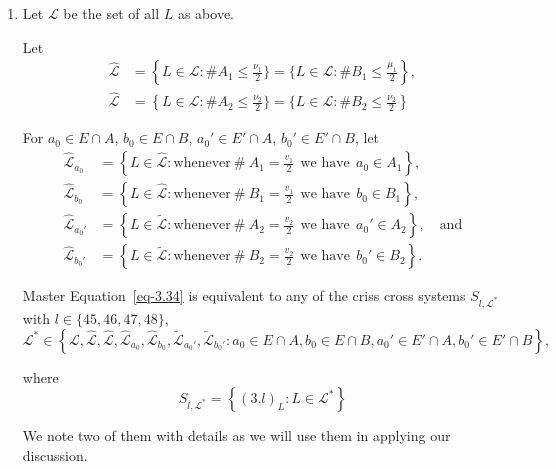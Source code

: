 \documentclass[a4paper,12pt]{article}
\theoremstyle{definition}
\theoremstyle{underlinethm}
\theoremstyle{definition}
\begin{document}
\begin{enumerate}[label=(\alph*)]
\item Let $\mathcal{L}$ be the set of all $L$ as above.

Let
\begin{align*}
\hat{\mathcal{L}} & = \left\{L \in  \mathcal{L} : \# A_{1} \leq \frac{\nu_{1}}{2}\} = \{L \in \mathcal{L} : \# B_{1} \leq \frac{\mu_{1}}{2}\right\},\\
\hat{\mathcal{L}} & = \left\{L \in \mathcal{L}  : \# A_{2} \leq \frac{\nu_{2}}{2}\} = \{L \in \mathcal{L} : \# B_{2} \leq \frac{\nu_{2}}{2}\right\}
\end{align*}

For $a_{0} \in E \cap A$, $b_{0} \in E \cap B$, $a_{0}' \in E' \cap A$, $b_{0}' \in E' \cap B$, let
\begin{align*}
\hat{\mathcal{L}}_{a_{0}} & = \left\{L \in  \hat{\mathcal{L}} : \text{whenever}~\#~ A_{1} = \frac{v_{1}}{2}~~ \text{we have}~~ a_{0} \in A_{1} \right\},\\
\hat{\mathcal{L}}_{b_{0}} & = \left\{L \in  \hat{\mathcal{L}} : \text{whenever} ~\#~ B_{1} = \frac{v_{1}}{2}~~ \text{we have}~~ b_{0} \in B_{1} \right\},\\
\hat{\mathcal{L}}_{a_{0}'} & = \left\{L \in  \widetilde{\mathcal{L}} : \text{whenever} ~\#~ A_{2} = \frac{v_{2}}{2}~~ \text{we have}~~ a_{0}' \in A_{2} \right\},\quad \text{and}\\
\hat{\mathcal{L}}_{b_{0}'} & = \left\{L \in  \widetilde{\mathcal{L}} : \text{whenever} ~\#~ B_{2} = \frac{v_{2}}{2}~~ \text{we have}~~ b_{0}' \in B_{2} \right\}.
\end{align*}
 
Master Equation~\eqref{eq-3.34} is equivalent to any of the criss cross systems $S_{l, \mathcal{L}^{\ast}}$ with $l \in \{45,46, 47, 48 \}$,
{\fontsize{10.5}{12.5}\selectfont
\begin{equation*}
\mathcal{L}^{\ast} \in \left\{\mathcal{L}, \hat{\mathcal{L}}, \hat{\mathcal{L}}, \hat{\mathcal{L}}_{a_{0}}, \hat{\mathcal{L}}_{b_{0}}, \widetilde{\mathcal{L}}_{a_{0}'}, \widetilde{\mathcal{L}}_{b_{0}'} : a_{0} \in E \cap A, b_{0} \in E \cap B, a_{0}' \in E' \cap A, b_{0}' \in E' \cap B \right\},
\end{equation*} }

where
\begin{equation}
S_{l, \mathcal{L}^{\ast}} = \left\{(3.l)_{L} : L \in \mathcal{L}^{*} \right\}\tag{3.49}\label{eq-3.49}
\end{equation}

We note two of them with details as we will use them in applying our discussion.


\end{enumerate}
\end{document}
